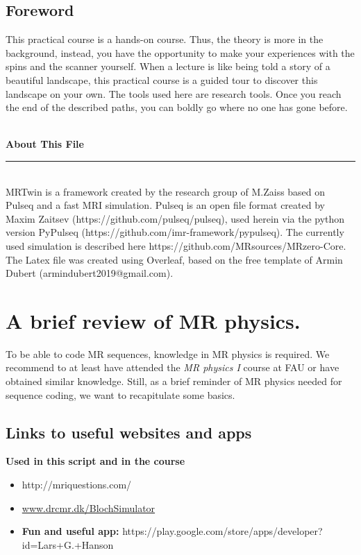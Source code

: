 \documentclass[a4paper,12pt]{extarticle}
\begin{document}
\subsection*{Foreword}
This practical course is a hands-on course. Thus, the theory is more in the background, instead, you have the opportunity to make your experiences with the spins and the scanner yourself. When a lecture is like being told a story of a beautiful landscape, this practical course is a guided tour to discover this landscape on your own. The tools used here are research tools. Once you reach the end of the described paths, you can boldly go where no one has gone before.
\\
\\
\small{\noindent \textbf{About This File} \vspace{-3mm}\\
\noindent \rule{3.3cm}{0.5pt} \\
 MRTwin is a framework created by the research group of M.Zaiss based on Pulseq and a fast MRI simulation. Pulseq is an open file format created by Maxim Zaitsev (https://github.com/pulseq/pulseq), used herein via the python version PyPulseq (https://github.com/imr-framework/pypulseq). The currently used simulation is described here https://github.com/MRsources/MRzero-Core. 
The Latex file was created using Overleaf, based on the free template of Armin Dubert (armindubert2019@gmail.com).}
\newpage
{}


\newpage
\section{A brief review of MR physics. }
\vspace{7.5cm}
 To be able to code MR sequences, knowledge in MR physics is required. We recommend to at least have attended the \emph{MR physics I} course at FAU or have obtained similar knowledge. Still, as a brief reminder of MR physics needed for sequence coding, we want to recapitulate some basics. 
 
\subsection{Links to useful websites and apps}
\textbf{Used in this script and in the course}
\begin{itemize}
\item http://mriquestions.com/
\item \href{http://www.drcmr.dk/BlochSimulator/}{www.drcmr.dk/BlochSimulator}
\item \textbf{Fun and useful app:} https://play.google.com/store/apps/developer?id=Lars+G.+Hanson
\end{itemize}
\end{document}
